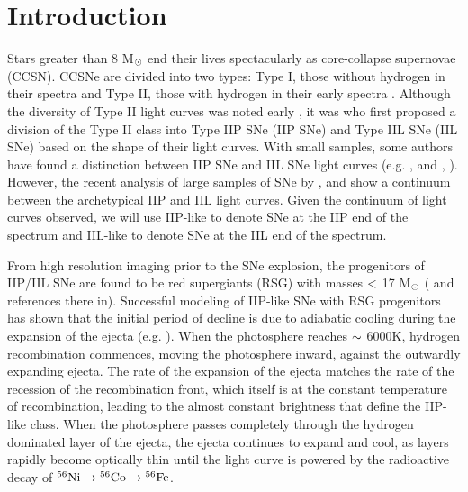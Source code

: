 \documentclass[a4paper,fleqn,usenatbib]{mnras}
\newcommand{\msun}{M$\rm{_{\odot}}$ }
\begin{document}
\section{Introduction}
Stars greater than 8 \msun end their lives spectacularly as core-collapse supernovae (CCSN). 
CCSNe are divided into two types: Type I, those without hydrogen in their spectra and Type II, those with hydrogen in their early spectra \citep{1941minkowski}.
Although the diversity of Type II light curves was noted early \citep{1964minkowski, 1967pskovskii}, it was \citet{1979barbon} who first proposed a division of the Type II class into Type IIP SNe (IIP SNe) and Type IIL SNe (IIL SNe) based on the shape of their light curves.
With small samples, some authors have found a distinction between IIP SNe and IIL SNe light curves  (e.g. \citealt{1993patat}, and \citealt{1994patat}, \citealt{2012arcavi}).
However, the recent analysis of large samples of SNe by \citet{2014anderson, 2014faran,2015sanders,2016valenti,2016galbany}, and \citet{2016rubin} show a continuum between the archetypical IIP and IIL light curves. 
Given the continuum of light curves observed, we will use IIP-like to denote SNe at the IIP end of the spectrum and IIL-like to denote SNe at the IIL end of the spectrum.

From high resolution imaging prior to the SNe explosion, the progenitors of IIP/IIL SNe are found to be red supergiants (RSG) with masses $\rm{<}$ 17  \msun (\citealt{2015smartt} and references there in).
Successful modeling of IIP-like SNe with RSG progenitors has shown that the initial period of decline is due to adiabatic cooling during the expansion of the ejecta (e.g. \citealt{1971grassberg,1977falk,1993blinnikov,2009kasen}).
When the photosphere reaches $\rm{\sim}$ 6000K, hydrogen recombination commences, moving the photosphere inward, against the outwardly expanding ejecta. 
The rate of the expansion of the ejecta matches the rate of the recession of the recombination front, which itself is at the constant temperature of recombination, leading to the almost constant brightness that define the IIP-like class.
When the photosphere passes completely through the hydrogen dominated layer of the ejecta, the ejecta continues to expand and cool, as layers rapidly become optically thin until the light curve is powered by the radioactive decay of $\rm{{}^{56}Ni \rightarrow {}^{56}Co \rightarrow {}^{56}Fe}$.
\end{document}
